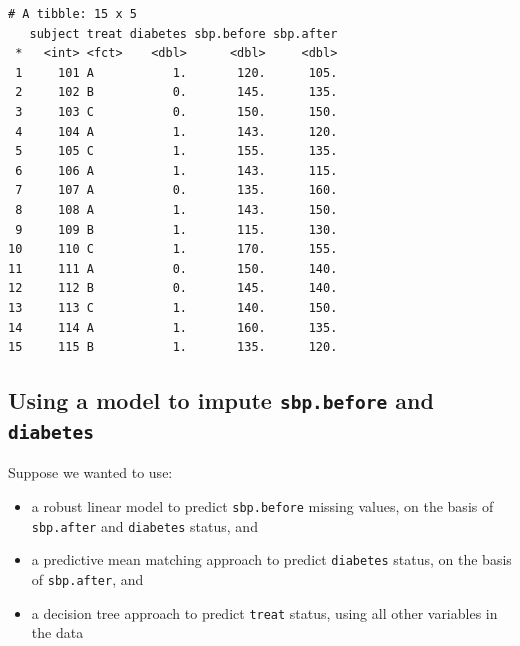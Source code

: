 \documentclass[]{book}
\newenvironment{Shaded}{\begin{snugshade}}{\end{snugshade}}
\newcommand{\KeywordTok}[1]{\textcolor[rgb]{0.13,0.29,0.53}{\textbf{#1}}}
\newcommand{\DecValTok}[1]{\textcolor[rgb]{0.00,0.00,0.81}{#1}}
\newcommand{\StringTok}[1]{\textcolor[rgb]{0.31,0.60,0.02}{#1}}
\newcommand{\OperatorTok}[1]{\textcolor[rgb]{0.81,0.36,0.00}{\textbf{#1}}}
\newcommand{\NormalTok}[1]{#1}
\providecommand{\tightlist}{%
  \setlength{\itemsep}{0pt}\setlength{\parskip}{0pt}}
\theoremstyle{definition}
\theoremstyle{definition}
\theoremstyle{definition}
\theoremstyle{remark}
\begin{document}
\begin{verbatim}
# A tibble: 15 x 5
   subject treat diabetes sbp.before sbp.after
 *   <int> <fct>    <dbl>      <dbl>     <dbl>
 1     101 A           1.       120.      105.
 2     102 B           0.       145.      135.
 3     103 C           0.       150.      150.
 4     104 A           1.       143.      120.
 5     105 C           1.       155.      135.
 6     106 A           1.       143.      115.
 7     107 A           0.       135.      160.
 8     108 A           1.       143.      150.
 9     109 B           1.       115.      130.
10     110 C           1.       170.      155.
11     111 A           0.       150.      140.
12     112 B           0.       145.      140.
13     113 C           1.       140.      150.
14     114 A           1.       160.      135.
15     115 B           1.       135.      120.
\end{verbatim}

\subsection{\texorpdfstring{Using a model to impute \texttt{sbp.before}
and
\texttt{diabetes}}{Using a model to impute sbp.before and diabetes}}\label{using-a-model-to-impute-sbp.before-and-diabetes}

Suppose we wanted to use:

\begin{itemize}
\tightlist
\item
  a robust linear model to predict \texttt{sbp.before} missing values,
  on the basis of \texttt{sbp.after} and \texttt{diabetes} status, and
\item
  a predictive mean matching approach to predict \texttt{diabetes}
  status, on the basis of \texttt{sbp.after}, and
\item
  a decision tree approach to predict \texttt{treat} status, using all
  other variables in the data
\end{itemize}

\begin{Shaded}
\end{Shaded}
\end{document}

